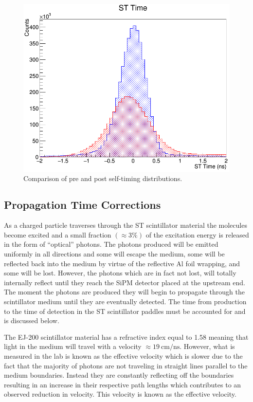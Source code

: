 	\begin{figure}[!htb]
		\centering
		\includegraphics[width=1.0\columnwidth]{calibration/figs/st_time_overlay_ch15}
		\caption{Comparison of pre and post self-timing distributions.}
		\label{fig:sttimeoverlaych15}
	\end{figure}

\subsection{Propagation Time Corrections} \label{sec:calib_ptc}

As a charged particle traverses through the ST scintillator material the molecules become excited and a small fraction $(\approx 3\%)$ \cite{pdg_2012} of the excitation energy is released in the form of ``optical'' photons.  The photons produced will be emitted uniformly in all directions and some will escape the medium, some will be reflected back into the medium by virtue of the reflective Al foil wrapping, and some will be lost.  However, the photons which are in fact not lost, will totally internally reflect until they reach the SiPM detector placed at the upstream end.  The moment the photons are produced they will begin to propagate through the scintillator medium until they are eventually detected.  The time from production to the time of detection in the ST scintillator paddles must be accounted for and is discussed below.

The EJ-200 scintillator material has a refractive index equal to 1.58 \cite{ej200_specs} meaning that light in the medium will travel with a velocity $\approx \mathrm{19\ cm/ns}$.  However, what is measured in the lab is known as the effective velocity which is slower due to the fact that the majority of photons are not traveling in straight lines parallel to the medium boundaries.  Instead they are constantly reflecting off the boundaries resulting in an increase in their respective path lengths which contributes to an observed reduction in velocity.  This velocity is known as the effective velocity.  

